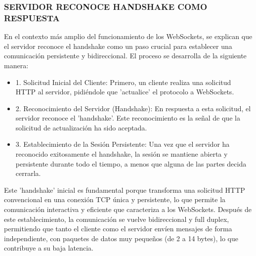 \documentclass{report}
\begin{document}
\subsubsection{SERVIDOR RECONOCE HANDSHAKE COMO RESPUESTA}
En el contexto más amplio del funcionamiento de los WebSockets, se  explican que el servidor reconoce el handshake como un paso 
crucial para establecer una comunicación persistente y bidireccional.
El proceso se desarrolla de la siguiente manera:
\begin{itemize}
    \item 1. Solicitud Inicial del Cliente: Primero, un cliente realiza una solicitud HTTP al servidor, pidiéndole que 'actualice' el 
    protocolo a WebSockets.
    \item 2. Reconocimiento del Servidor (Handshake): En respuesta a esta solicitud, el servidor reconoce el 'handshake'. Este reconocimiento 
    es la señal de que la solicitud de actualización ha sido aceptada.
    \item 3. Establecimiento de la Sesión Persistente: Una vez que el servidor ha reconocido exitosamente el handshake, la sesión se mantiene 
    abierta y persistente durante todo el tiempo, a menos que alguna de las partes decida cerrarla.
\end{itemize}
Este 'handshake' inicial es fundamental porque transforma una solicitud HTTP convencional en una conexión TCP única y persistente, lo que 
permite la comunicación interactiva y eficiente que caracteriza a los WebSockets. Después de este establecimiento, la comunicación se vuelve 
bidireccional y full duplex, permitiendo que tanto el cliente como el servidor envíen mensajes de forma independiente, con paquetes de datos 
muy pequeños (de 2 a 14 bytes), lo que contribuye a su baja latencia.
\end{document}
